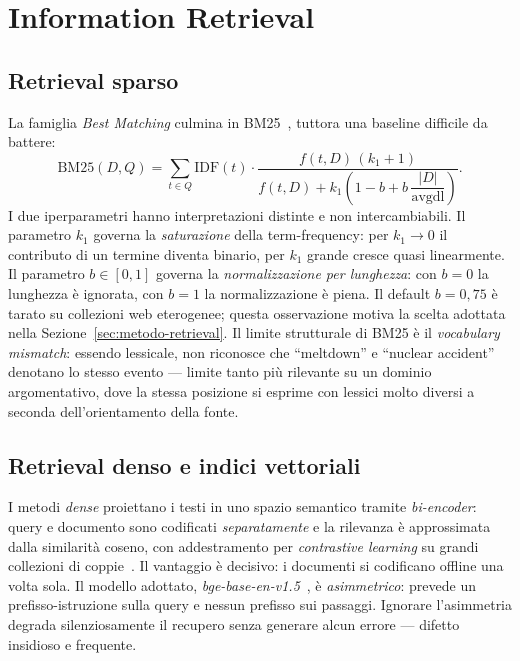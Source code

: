 \documentclass[11pt,a4paper]{report}
\begin{document}
\section{Information Retrieval}

\subsection{Retrieval sparso}
La famiglia \emph{Best Matching} culmina in BM25~\cite{bm25}, tuttora una baseline difficile
da battere:
\begin{equation}\label{eq:bm25}
\text{BM25}(D,Q) = \sum_{t \in Q} \text{IDF}(t) \cdot
\frac{f(t,D)\,(k_1 + 1)}{f(t,D) + k_1\left(1 - b + b\,\dfrac{|D|}{\text{avgdl}}\right)} .
\end{equation}
I due iperparametri hanno interpretazioni distinte e non intercambiabili. Il parametro $k_1$
governa la \emph{saturazione} della term-frequency: per $k_1 \to 0$ il contributo di un
termine diventa binario, per $k_1$ grande cresce quasi linearmente. Il parametro $b \in [0,1]$
governa la \emph{normalizzazione per lunghezza}: con $b=0$ la lunghezza è ignorata, con $b=1$
la normalizzazione è piena. Il default $b = 0{,}75$ è tarato su collezioni web eterogenee;
questa osservazione motiva la scelta adottata nella Sezione~\ref{sec:metodo-retrieval}. Il
limite strutturale di BM25 è il \emph{vocabulary mismatch}: essendo lessicale, non riconosce
che ``meltdown'' e ``nuclear accident'' denotano lo stesso evento --- limite tanto più
rilevante su un dominio argomentativo, dove la stessa posizione si esprime con lessici molto
diversi a seconda dell'orientamento della fonte.

\subsection{Retrieval denso e indici vettoriali}
I metodi \emph{dense} proiettano i testi in uno spazio semantico tramite \emph{bi-encoder}:
query e documento sono codificati \emph{separatamente} e la rilevanza è approssimata dalla
similarità coseno, con addestramento per \emph{contrastive learning} su grandi collezioni di
coppie~\cite{dpr}. Il vantaggio è decisivo: i documenti si codificano offline una volta sola.
Il modello adottato, \emph{bge-base-en-v1.5}~\cite{bge}, è \emph{asimmetrico}: prevede un
prefisso-istruzione sulla query e nessun prefisso sui passaggi. Ignorare l'asimmetria degrada
silenziosamente il recupero senza generare alcun errore --- difetto insidioso e frequente.
\end{document}
